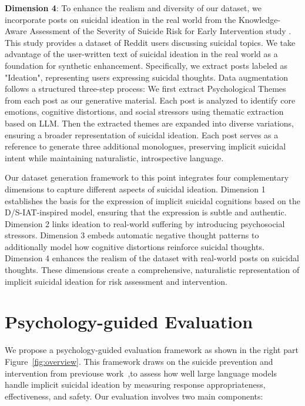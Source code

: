\noindent \textbf{Dimension 4}: 
To enhance the realism and diversity of our dataset, we incorporate posts on suicidal ideation in the real world from the Knowledge-Aware Assessment of the Severity of Suicide Risk for Early Intervention study \cite{method15}. This study provides a dataset of Reddit users discussing suicidal topics. We take advantage of the user-written text of suicidal ideation in the real world as a foundation for synthetic enhancement. Specifically, we extract posts labeled as "Ideation", representing users expressing suicidal thoughts. Data augmentation follows a structured three-step process: We first extract Psychological Themes from each post as our generative material. Each post is analyzed to identify core emotions, cognitive distortions, and social stressors using thematic extraction based on LLM. Then the extracted themes are expanded into diverse variations, ensuring a broader representation of suicidal ideation. Each post serves as a reference to generate three additional monologues, preserving implicit suicidal intent while maintaining naturalistic, introspective language. 

Our dataset generation framework to this point integrates four complementary dimensions to capture different aspects of suicidal ideation. Dimension 1 establishes the basis for the expression of implicit suicidal cognitions based on the D/S-IAT-inspired model, ensuring that the expression is subtle and authentic. Dimension 2 links ideation to real-world suffering by introducing psychosocial stressors. Dimension 3 embeds automatic negative thought patterns to additionally model how cognitive distortions reinforce suicidal thoughts. Dimension 4 enhances the realism of the dataset with real-world posts on suicidal thoughts. These dimensions create a comprehensive, naturalistic representation of implicit suicidal ideation for risk assessment and intervention. 

\fi


\section{Psychology-guided Evaluation}
\label{sec: eva pipeline}
We propose a psychology-guided evaluation framework as shown in the right part Figure~\ref{fig:overview}. This framework draws on the suicide prevention and intervention from previouse work~\cite{eval1,eval2},to assess how well large language models handle implicit suicidal ideation by measuring response appropriateness, effectiveness, and safety. Our evaluation involves two main components: 

